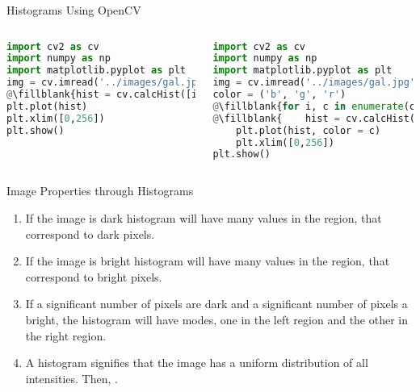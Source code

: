 \begin{frame}[t, fragile]{Histograms Using OpenCV}
\begin{columns}[t]
       \begin{lstlisting}[caption=Histogram of a Grayscale Image, language=Python, escapechar=\@]
import cv2 as cv
import numpy as np
import matplotlib.pyplot as plt
img = cv.imread('../images/gal.jpg', cv.IMREAD_GRAYSCALE)
@\fillblank{hist = cv.calcHist([img], [0], None, [256], [0,256])}@
plt.plot(hist)
plt.xlim([0,256])
plt.show()
        \end{lstlisting}
       \begin{lstlisting}[caption=Histogram of a Color Image,language=Python, escapechar=\@]
import cv2 as cv
import numpy as np
import matplotlib.pyplot as plt
img = cv.imread('../images/gal.jpg', cv.IMREAD_COLOR)
color = ('b', 'g', 'r')
@\fillblank{for i, c in enumerate(color):}@
@\fillblank{    hist = cv.calcHist([img], [i], None, [256], [0,256])}@
    plt.plot(hist, color = c)
    plt.xlim([0,256])
plt.show()
         \end{lstlisting}
\end{columns}
\end{frame}

\begin{frame}{Image Properties through Histograms}
    \begin{enumerate}
      \item If the image is dark histogram will have many values in the  region, that correspond to  dark pixels.

      \item If the image is bright histogram will have many values in the  region, that correspond to  bright pixels.

      \item If a significant number of pixels are dark and a significant number of pixels a bright, the histogram will have  modes, one in the left region and the other in the right region.

      \item A  histogram signifies that the image has a uniform distribution of all intensities. Then, .

    \end{enumerate}
\end{frame}


